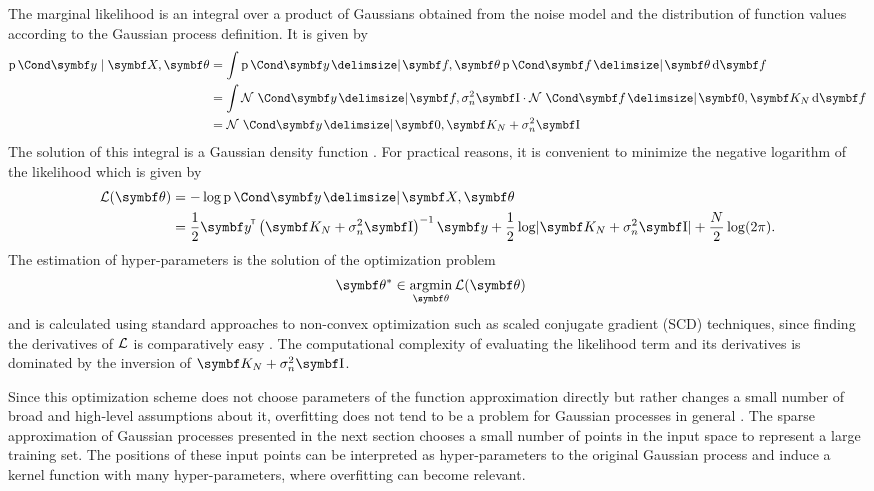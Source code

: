 The marginal likelihood is an integral over a product of Gaussians obtained from the noise model and the distribution of function values according to the Gaussian process definition.
It is given by
\begin{align}
    \begin{split}
        \label{eq:gp:gp_f_marginalization}
        \Prob{\mat{y} \mid \mat{X}, \mat{\theta}} &= \int \Prob{\mat{y} \given \mat{f}, \mat{\theta}} \Prob{\mat{f} \given \mat{\theta}} \diff \mat{f} \\
        &= \int \Gaussian{\mat{y} \given \mat{f}, \sigma_n^2 \Eye} \cdot \Gaussian{\mat{f} \given \mat{0}, \mat{K_N}} \diff \mat{f} \\
        &= \Gaussian{\mat{y} \given \mat{0}, \mat{K_N} + \sigma_n^2 \Eye}
    \end{split}
\end{align}
The solution of this integral is a Gaussian density function \cite{petersen_matrix_2008}.
For practical reasons, it is convenient to minimize the negative logarithm of the likelihood which is given by
\begin{align}
    \begin{split}
        \Lc(\mat{\theta}) &= -\log\Prob{\mat{y} \given \mat{X}, \mat{\theta}} \\
        &= \frac{1}{2} \mat{y}\tran \left( \mat{K_N} + \sigma_n^2 \Eye \right)^{-1} \mat{y} +
        \frac{1}{2} \log \abs{\mat{K_N} + \sigma_n^2 \Eye} +
        \frac{N}{2} \log(2\pi).
    \end{split}
\end{align}
The estimation of hyper-parameters is the solution of the optimization problem
\begin{align}
    \mat{\theta}^\ast & \in \argmin_{\mat{\theta}} \Lc(\mat{\theta})
\end{align}
and is calculated using standard approaches to non-convex optimization such as scaled conjugate gradient (SCD) techniques, since finding the derivatives of $\mathcal{L}$ is comparatively easy \cite{rasmussen_gaussian_2006}.
The computational complexity of evaluating the likelihood term and its derivatives is dominated by the inversion of $\mat{K_N} + \sigma_n^2 \Eye$.

Since this optimization scheme does not choose parameters of the function approximation directly but rather changes a small number of broad and high-level assumptions about it, overfitting does not tend to be a problem for Gaussian processes in general \cite{snelson_flexible_2007}.
The sparse approximation of Gaussian processes presented in the next section chooses a small number of points in the input space to represent a large training set.
The positions of these input points can be interpreted as hyper-parameters to the original Gaussian process and induce a kernel function with many hyper-parameters, where overfitting can become relevant.


